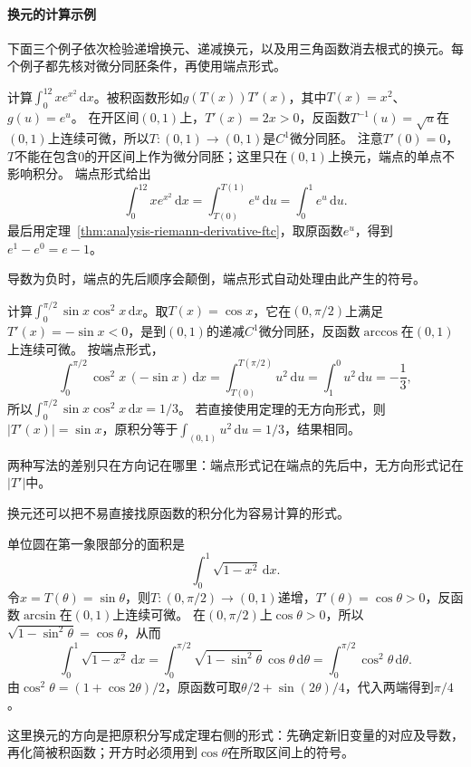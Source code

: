 \paragraph{换元的计算示例}
下面三个例子依次检验递增换元、递减换元，以及用三角函数消去根式的换元。每个例子都先核对微分同胚条件，再使用端点形式。
\begin{example}[用递增换元计算指数型积分]
计算$\int_0^12xe^{x^2}\,\mathrm dx$。被积函数形如$g(T(x))T'(x)$，其中$T(x)=x^2$、$g(u)=e^u$。
在开区间$(0,1)$上，$T'(x)=2x>0$，反函数$T^{-1}(u)=\sqrt u$在$(0,1)$上连续可微，所以$T:(0,1)\to(0,1)$是$C^1$微分同胚。
注意$T'(0)=0$，$T$不能在包含$0$的开区间上作为微分同胚；这里只在$(0,1)$上换元，端点的单点不影响积分。
端点形式给出
\[
 \int_0^12xe^{x^2}\,\mathrm dx=\int_{T(0)}^{T(1)}e^u\,\mathrm du=\int_0^1e^u\,\mathrm du.
\]
最后用定理~\ref{thm:analysis-riemann-derivative-ftc}，取原函数$e^u$，得到$e^1-e^0=e-1$。
\end{example}

导数为负时，端点的先后顺序会颠倒，端点形式自动处理由此产生的符号。
\begin{example}[用递减换元计算三角函数积分]
计算$\int_0^{\pi/2}\sin x\cos^2x\,\mathrm dx$。取$T(x)=\cos x$，它在$(0,\pi/2)$上满足$T'(x)=-\sin x<0$，是到$(0,1)$的递减$C^1$微分同胚，反函数$\arccos$在$(0,1)$上连续可微。
按端点形式，
\[
 \int_0^{\pi/2}\cos^2x\,(-\sin x)\,\mathrm dx=\int_{T(0)}^{T(\pi/2)}u^2\,\mathrm du=\int_1^0u^2\,\mathrm du=-\frac13,
\]
所以$\int_0^{\pi/2}\sin x\cos^2x\,\mathrm dx=1/3$。
若直接使用定理的无方向形式，则$|T'(x)|=\sin x$，原积分等于$\int_{(0,1)}u^2\,\mathrm du=1/3$，结果相同。
\end{example}
两种写法的差别只在方向记在哪里：端点形式记在端点的先后中，无方向形式记在$|T'|$中。

换元还可以把不易直接找原函数的积分化为容易计算的形式。
\begin{example}[用正弦换元计算四分之一单位圆的面积]
单位圆在第一象限部分的面积是
\[
 \int_0^1\sqrt{1-x^2}\,\mathrm dx.
\]
令$x=T(\theta)=\sin\theta$，则$T:(0,\pi/2)\to(0,1)$递增，$T'(\theta)=\cos\theta>0$，反函数$\arcsin$在$(0,1)$上连续可微。
在$(0,\pi/2)$上$\cos\theta>0$，所以$\sqrt{1-\sin^2\theta}=\cos\theta$，从而
\[
 \int_0^1\sqrt{1-x^2}\,\mathrm dx
 =\int_0^{\pi/2}\sqrt{1-\sin^2\theta}\,\cos\theta\,\mathrm d\theta
 =\int_0^{\pi/2}\cos^2\theta\,\mathrm d\theta.
\]
由$\cos^2\theta=(1+\cos2\theta)/2$，原函数可取$\theta/2+\sin(2\theta)/4$，代入两端得到$\pi/4$。
\end{example}
这里换元的方向是把原积分写成定理右侧的形式：先确定新旧变量的对应及导数，再化简被积函数；开方时必须用到$\cos\theta$在所取区间上的符号。

